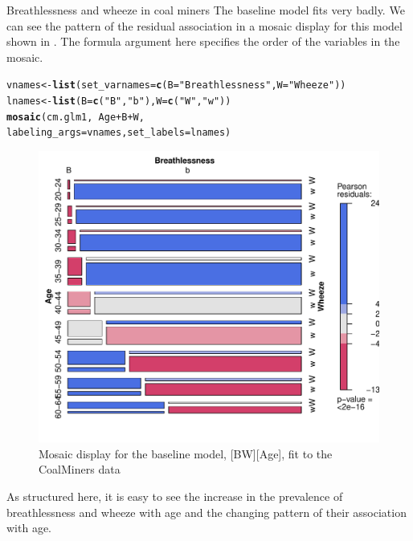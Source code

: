 \documentclass[11pt]{book}\usepackage[]{graphicx}\usepackage[]{color}
\makeatletter
\newcommand{\hlstr}[1]{\textcolor[rgb]{0.192,0.494,0.8}{#1}}%
\newcommand{\hlopt}[1]{\textcolor[rgb]{0,0,0}{#1}}%
\newcommand{\hlstd}[1]{\textcolor[rgb]{0.345,0.345,0.345}{#1}}%
\newcommand{\hlkwb}[1]{\textcolor[rgb]{0.69,0.353,0.396}{#1}}%
\newcommand{\hlkwc}[1]{\textcolor[rgb]{0.333,0.667,0.333}{#1}}%
\newcommand{\hlkwd}[1]{\textcolor[rgb]{0.737,0.353,0.396}{\textbf{#1}}}%
\newenvironment{kframe}{%
 \def\at@end@of@kframe{}%
 \ifinner\ifhmode%
  \def\at@end@of@kframe{\end{minipage}}%
  \begin{minipage}{\columnwidth}%
 \fi\fi%
 \def\FrameCommand##1{\hskip\@totalleftmargin \hskip-\fboxsep
 \colorbox{shadecolor}{##1}\hskip-\fboxsep
     \hskip-\linewidth \hskip-\@totalleftmargin \hskip\columnwidth}%
 \MakeFramed {\advance\hsize-\width
   \@totalleftmargin\z@ \linewidth\hsize
   \@setminipage}}%
 {\par\unskip\endMakeFramed%
 \at@end@of@kframe}
\newenvironment{knitrout}{}{} %
\renewenvironment{knitrout}{\small\renewcommand{\baselinestretch}{.85}}{} %
\makeatother
\begin{document}
\begin{Example}[coalminers]{Breathlessness and wheeze in coal miners}
The baseline model 
fits very badly.  We can see the pattern of the residual association in
a mosaic display for this model shown in .
The formula argument here specifies the order of the variables in the mosaic.
\begin{knitrout}
\color{fgcolor}\begin{kframe}
\begin{alltt}
\hlstd{vnames} \hlkwb{<-} \hlkwd{list}\hlstd{(}\hlkwc{set_varnames} \hlstd{=} \hlkwd{c}\hlstd{(}\hlkwc{B}\hlstd{=}\hlstr{"Breathlessness"}\hlstd{,} \hlkwc{W}\hlstd{=}\hlstr{"Wheeze"}\hlstd{))}
\hlstd{lnames} \hlkwb{<-} \hlkwd{list}\hlstd{(}\hlkwc{B}\hlstd{=}\hlkwd{c}\hlstd{(}\hlstr{"B"}\hlstd{,} \hlstr{"b"}\hlstd{),} \hlkwc{W} \hlstd{=} \hlkwd{c}\hlstd{(}\hlstr{"W"}\hlstd{,} \hlstr{"w"}\hlstd{))}
\hlkwd{mosaic}\hlstd{(cm.glm1,} \hlopt{~} \hlstd{Age} \hlopt{+} \hlstd{B} \hlopt{+} \hlstd{W,}
       \hlkwc{labeling_args}\hlstd{=vnames,} \hlkwc{set_labels}\hlstd{=lnames)}
\end{alltt}
\end{kframe}\begin{figure}[!htbp]


\centerline{\includegraphics[width=.7\textwidth]{ch08/fig/cm-mosaic1-1} }

\caption[Mosaic display for the baseline model, BW Age, fit to the CoalMiners data]{Mosaic display for the baseline model, [BW][Age], fit to the CoalMiners data\label{fig:cm-mosaic1}}
\end{figure}


\end{knitrout}
\noindent As structured here, it is easy to see the increase in the prevalence of
breathlessness and wheeze with age and the changing pattern of their association
with age.


\end{Example}
\end{document}
